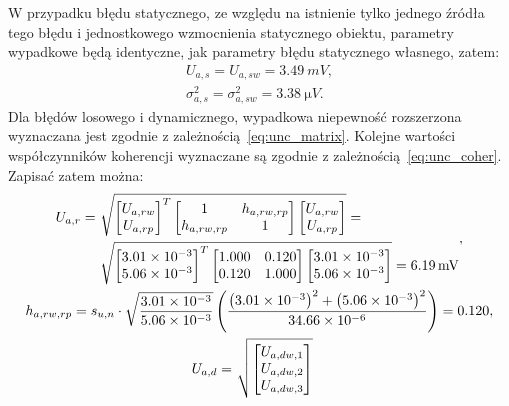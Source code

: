 W przypadku błędu statycznego, ze względu na istnienie tylko jednego źródła tego błędu i jednostkowego wzmocnienia statycznego obiektu, parametry wypadkowe będą identyczne, jak parametry błędu statycznego własnego, zatem:
\begin{gather}
U_{a,s} = U_{a,sw} = \qty{3.49}{mV} \label{eq:sym_parta_uncert_stat}, \\
\sigma_{a,s}^{2} = \sigma_{a,sw}^{2} = \qty{3.38}{\micro V} \label{eq:sym_parta_var_stat}.
\end{gather}
Dla błędów losowego i dynamicznego, wypadkowa niepewność rozszerzona wyznaczana jest zgodnie z zależnością~\eqref{eq:unc_matrix}. Kolejne wartości współczynników koherencji wyznaczane są zgodnie z zależnością~\eqref{eq:unc_coher}. Zapisać zatem można:
\begin{gather}
\begin{split}
U_{a,r} =~
& \sqrt{
\begin{bmatrix}
U_{a,rw} \\ U_{a,rp}
\end{bmatrix}^{T}
\begin{bmatrix}
1           & h_{a,rw,rp} \\
h_{a,rw,rp} & 1
\end{bmatrix}
\begin{bmatrix}
U_{a,rw} \\ U_{a,rp}
\end{bmatrix}} =~\\
& \sqrt{
\begin{bmatrix}
\num{3.01e-3} \\ \num{5.06e-3}
\end{bmatrix}^{T}
\begin{bmatrix}
1.000 & 0.120 \\
0.120 & 1.000
\end{bmatrix}
\begin{bmatrix}
\num{3.01e-3} \\ \num{5.06e-3}
\end{bmatrix}} = \qty{6.19}{mV}
\end{split}
\label{eq:sym_parta_uncert_rand}, \\
h_{a,rw,rp} = s_{u,n} \cdot \sqrt{\frac{\num{3.01e-3}}{\num{5.06e-3}}} \left( \frac{\left(\num{3.01e-3}\right)^{2} + \left(\num{5.06e-3}\right)^{2}}{\num{34.66e-6}} \right) = 0.120 \label{eq:sym_parta_coher_rw_rp}, \\
\begin{split}
U_{a,d} = ~ & \sqrt{
\begin{bmatrix}
U_{a,dw,1} \\ U_{a,dw,2} \\ U_{a,dw,3}

\end{bmatrix}}
\end{split}
\end{gather}
